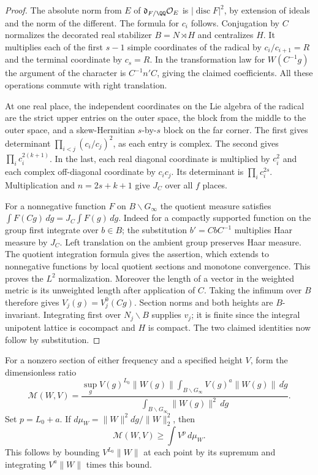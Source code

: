 \documentclass[a4paper,11pt]{article}
\theoremstyle{definition}
\theoremstyle{remark}
\numberwithin{equation}{section}
\begin{document}
\begin{proof}
The absolute norm from \(E\) of \(\mathfrak d_{F/\QQ}\mathcal O_E\)
is \(|\operatorname{disc}F|^2\), by extension of ideals and the
norm of the different. The formula for \(c_i\) follows.
Conjugation by \(C\) normalizes the decorated real stabilizer
\(B=N\rtimes H\) and centralizes \(H\). It multiplies each of
the first \(s-1\) simple coordinates of the radical by
\(c_i/c_{i+1}=R\) and the terminal coordinate by \(c_s=R\).
In the transformation law for \(W(C^{-1}g)\) the argument
of the character is \(C^{-1}n'C\), giving the claimed coefficients.
All these operations commute with right translation.

At one real place, the independent coordinates on the Lie
algebra of the radical are the strict upper entries on the
outer space, the block from the middle to the outer space,
and a skew-Hermitian \(s\)-by-\(s\) block on the far corner.
The first gives determinant \(\prod_{i<j}(c_i/c_j)^2\), as
each entry is complex. The second gives \(\prod_i c_i^{2(k+1)}\).
In the last, each real diagonal coordinate is multiplied by
\(c_i^2\) and each complex off-diagonal coordinate by \(c_ic_j\).
Its determinant is \(\prod_i c_i^{2s}\). Multiplication and
\(n=2s+k+1\) give \(J_C\) over all \(f\) places.

For a nonnegative function \(F\) on \(B\backslash G_\infty\)
the quotient measure satisfies
\(\int F(Cg)\,d\dot g=J_C\int F(g)\,d\dot g\).
Indeed for a compactly supported function on the group first
integrate over \(b\in B\); the substitution \(b'=CbC^{-1}\)
multiplies Haar measure by \(J_C\). Left translation on the
ambient group preserves Haar measure. The quotient integration
formula gives the assertion, which extends to nonnegative
functions by local quotient sections and monotone convergence.
This proves the \(L^2\) normalization. Moreover the length
of a vector in the weighted metric is its unweighted length
after application of \(C\). Taking the infimum over \(B\)
therefore gives \(V_j(g)=V_j^0(Cg)\). Section norms and both
heights are \(B\)-invariant. Integrating first over
\(N_j\backslash B\) supplies \(v_j\); it is finite since the
integral unipotent lattice is cocompact and \(H\) is compact.
The two claimed identities now follow by substitution.
\end{proof}

For a nonzero section of either frequency and a specified
height \(V\), form the dimensionless ratio
\[
 \mathcal M(W,V)=
 \frac{\displaystyle\sup_g V(g)^{L_0}\|W(g)\|
        \displaystyle\int_{B\backslash G_\infty}
                         V(g)^a\|W(g)\|\,d\dot g}
      {\displaystyle\int_{B\backslash G_\infty}\|W(g)\|^2\,d\dot g}.
\]
Set \(p=L_0+a\). If \(d\mu_W=\|W\|^2d\dot g/\|W\|_2^2\), then
\begin{equation}
                      \mathcal M(W,V)\ge\int V^p\,d\mu_W .
 \label{eq:momentcomparison555}
\end{equation}
This follows by bounding \(V^{L_0}\|W\|\) at each point by
its supremum and integrating \(V^a\|W\|\) times this bound.
\end{document}
